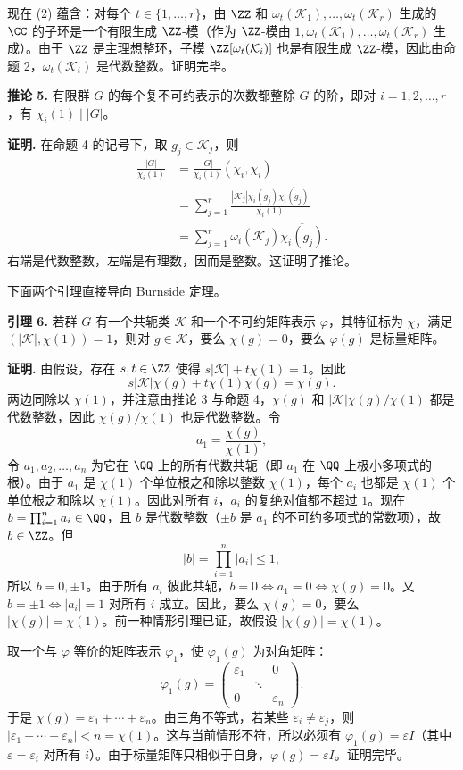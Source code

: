 现在 (2) 蕴含：对每个 $t\in\{1,
\ldots,r\}$，由 $\ZZ$ 和 $\omega_t(\mathcal K_1),\ldots,\omega_t(\mathcal K_r)$ 生成的 $\CC$ 的子环是一个有限生成 $\ZZ$-模（作为 $\ZZ$-模由 $1,\omega_t(\mathcal K_1),\ldots,\omega_t(\mathcal K_r)$ 生成）。由于 $\ZZ$ 是主理想整环，子模 $\ZZ[\omega_t(\mathcal K_i)]$ 也是有限生成 $\ZZ$-模，因此由命题 2，$\omega_t(\mathcal K_i)$ 是代数整数。证明完毕。

\noindent\textbf{推论 5.} 有限群 $G$ 的每个复不可约表示的次数都整除 $G$ 的阶，即对 $i=1,2,\ldots,r$，有 $\chi_i(1)\mid |G|$。

\noindent\textbf{证明.} 在命题 4 的记号下，取 $g_j\in\mathcal K_j$，则
\[
\begin{aligned}
  \frac{|G|}{\chi_i(1)}
  &=\frac{|G|}{\chi_i(1)}(\chi_i,\chi_i)\\
  &=\sum_{j=1}^r\frac{|\mathcal K_j|\chi_i(g_j)\overline{\chi_i(g_j)}}{\chi_i(1)}\\
  &=\sum_{j=1}^r \omega_i(\mathcal K_j)\overline{\chi_i(g_j)}.
\end{aligned}
\]
右端是代数整数，左端是有理数，因而是整数。这证明了推论。

下面两个引理直接导向 Burnside 定理。

\noindent\textbf{引理 6.} 若群 $G$ 有一个共轭类 $\mathcal K$ 和一个不可约矩阵表示 $\varphi$，其特征标为 $\chi$，满足 $(|\mathcal K|,\chi(1))=1$，则对 $g\in\mathcal K$，要么 $\chi(g)=0$，要么 $\varphi(g)$ 是标量矩阵。

\noindent\textbf{证明.} 由假设，存在 $s,t\in\ZZ$ 使得 $s|\mathcal K|+t\chi(1)=1$。因此
\[
  s|\mathcal K|\chi(g)+t\chi(1)\chi(g)=\chi(g).
\]
两边同除以 $\chi(1)$，并注意由推论 3 与命题 4，$\chi(g)$ 和 $|\mathcal K|\chi(g)/\chi(1)$ 都是代数整数，因此 $\chi(g)/\chi(1)$ 也是代数整数。令
\[
  a_1=\frac{\chi(g)}{\chi(1)},
\]
令 $a_1,a_2,\ldots,a_n$ 为它在 $\QQ$ 上的所有代数共轭（即 $a_1$ 在 $\QQ$ 上极小多项式的根）。由于 $a_1$ 是 $\chi(1)$ 个单位根之和除以整数 $\chi(1)$，每个 $a_i$ 也都是 $\chi(1)$ 个单位根之和除以 $\chi(1)$。因此对所有 $i$，$a_i$ 的复绝对值都不超过 $1$。现在 $b=\prod_{i=1}^n a_i\in\QQ$，且 $b$ 是代数整数（$\pm b$ 是 $a_1$ 的不可约多项式的常数项），故 $b\in\ZZ$。但
\[
  |b|=\prod_{i=1}^n |a_i|\leq 1,
\]
所以 $b=0,\pm1$。由于所有 $a_i$ 彼此共轭，$b=0\Longleftrightarrow a_1=0\Longleftrightarrow \chi(g)=0$。又 $b=\pm1\Longleftrightarrow |a_i|=1$ 对所有 $i$ 成立。因此，要么 $\chi(g)=0$，要么 $|\chi(g)|=\chi(1)$。前一种情形引理已证，故假设 $|\chi(g)|=\chi(1)$。

取一个与 $\varphi$ 等价的矩阵表示 $\varphi_1$，使 $\varphi_1(g)$ 为对角矩阵：
\[
  \varphi_1(g)=\begin{pmatrix}
  \varepsilon_1&&0\\
  &\ddots&\\
  0&&\varepsilon_n
  \end{pmatrix}.
\]
于是 $\chi(g)=\varepsilon_1+\cdots+\varepsilon_n$。由三角不等式，若某些 $\varepsilon_i\neq\varepsilon_j$，则 $|\varepsilon_1+\cdots+\varepsilon_n|<n=\chi(1)$。这与当前情形不符，所以必须有 $\varphi_1(g)=\varepsilon I$（其中 $\varepsilon=\varepsilon_i$ 对所有 $i$）。由于标量矩阵只相似于自身，$\varphi(g)=\varepsilon I$。证明完毕。

